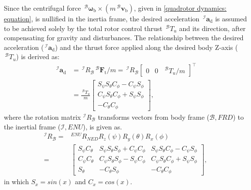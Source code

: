\documentclass[lettersize,journal]{IEEEtran}
\begin{document}
Since the centrifugal force $\,^\mathcal{B} \boldsymbol{\omega}_{\text{b}} \times (m \,^\mathcal{B} \boldsymbol{v}_{\text{b}})$, given in \eqref{quadrotor dynamics: equation}, is nullified in the inertia frame, the desired acceleration $\,^\mathcal{I}\boldsymbol{a}_{\text{d}}$ is assumed to be achieved solely by the total rotor control thrust $\,^\mathcal{B} T_u$ and its direction, after compensating for gravity and disturbances.
The relationship between the desired acceleration ($\,^\mathcal{I}\boldsymbol{a}_{\text{d}}$) and the thrust force applied along the desired body Z-axis ($\,^\mathcal{B} T_u$) is derived as:
\begin{align} \label{a_des: equation}
    \,^\mathcal{I} \boldsymbol{a}_{\text{d}} &=  \,^\mathcal{I}R_{\mathcal{B}} \,^\mathcal{B} \boldsymbol{F}_{\text{t}}/m = \,^\mathcal{I}R_{\mathcal{B}} \begin{bmatrix} 0 & 0 & \,^\mathcal{B} T_u /m\end{bmatrix}^\top \nonumber \\
    &= \frac{\,^\mathcal{B} T_u}{m}\begin{bmatrix} S_\psi S_{\theta} C_{\phi} -C_\psi S_{\phi} \\ C_\psi S_{\theta} C_{\phi} +S_\psi S_{\phi} \\- C_{\theta} C_{\phi} \end{bmatrix},
\end{align}
where the rotation matrix $^\mathcal{I}R_\mathcal{B}$ transforms vectors from body frame ($\mathcal{B}, FRD$) to the inertial frame ($\mathcal{I}, ENU$), is given as.
\begin{align}
\label{I_R_B: equation}
    ^\mathcal{I}R_\mathcal{B} = & ^{ENU}R_{NED} R_z(\psi) R_y(\theta) R_x(\phi) \nonumber \\
    = & \begin{bmatrix} S_\psi C_\theta &S_\psi S_\theta S_\phi +C_\psi C_\phi &S_\psi S_\theta C_\phi -C_\psi S_\phi \\C_\psi C_\theta &C_\psi S_\theta S_\phi -S_\psi C_\phi &C_\psi S_\theta C_\phi +S_\psi S_\phi \\ S_\theta &- C_\theta S_\phi & - C_\theta C_\phi \end{bmatrix},
\end{align}
in which $S_x = sin(x)$ and $C_x = cos(x)$.
\end{document}
